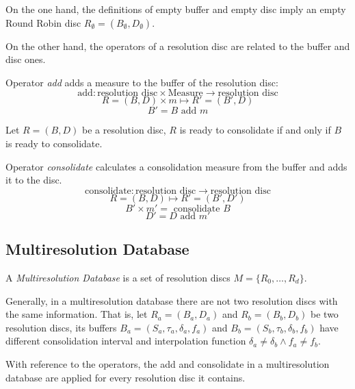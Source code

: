 On the one hand, the definitions of empty buffer and empty disc imply
an empty Round Robin disc $R_{\emptyset} = (B_{\emptyset},D_{\emptyset})$.

On the other hand, the operators of a resolution disc are related to
the buffer and disc ones.

\begin{definition}
  Operator \emph{add} adds a measure  to the buffer of the resolution disc:
  \[
  \text{add}: \text{resolution disc} \times \text{Measure}
  \longrightarrow \text{resolution disc}
  \]
  \[
  R=(B,D) \times m \mapsto R'= (B',D)
  \]
  \[
  B'= B \text{ add } m
  \]
\end{definition}

\begin{definition}
  Let $R=(B,D)$ be a resolution disc, $R$ is ready to consolidate if
  and only if $B$ is ready to consolidate.
\end{definition}

\begin{definition}
  Operator \emph{consolidate} calculates a consolidation measure from
  the buffer and adds it to the disc.
  \[
  \text{consolidate}: \text{resolution disc} \longrightarrow
  \text{resolution disc}
  \]
  \[
  R=(B,D) \mapsto R'= (B',D')
  \]
  \[
  B' \times m'= \text{ consolidate } B 
  \]
  \[
  D'= D \text{ add } m'
  \]
\end{definition}



\subsection{Multiresolution Database}\label{sec:model:rrd}

\begin{definition}
  A \emph{Multiresolution Database} is a set of resolution discs
  $M=\{R_0,\ldots,R_d\}$.
\end{definition}

 
Generally, in a multiresolution database there are not two resolution discs
with the same information. That is, let $R_a = (B_a, D_a)$ and $R_b =
(B_b, D_b)$ be two resolution discs, its buffers
$B_a=(S_a,\tau_a,\delta_a,f_a)$ and $B_b=(S_b,\tau_b,\delta_b,f_b)$
have different consolidation interval and interpolation function
$\delta_a \neq \delta_b \wedge f_a \neq f_b$.


With reference to the operators, the add and consolidate in a multiresolution database are applied for every resolution disc it contains.









